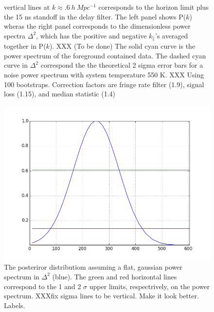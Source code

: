 \documentclass[twocolumn,numberedappendix]{emulateapj} \shorttitle{PSA64}
\begin{document}
\begin{figure}[h!]
{vertical lines at $k\approx{.6\ h\ Mpc^{-1}}$ corresponds to the horizon limit
plus the 15 ns standoff in the delay filter. The left panel shows P($k$) wheras
the right panel corresponds to the dimensionless power spectra $\Delta^{2}$,
which has the positive and negative $k_{\parallel}$'s averaged together in
P($k$). XXX (To be done) The solid cyan curve is the power spectrum of the
foreground contained data. The dashed cyan curve in $\Delta^{2}$ correspond the
the theoretical 2 sigma error bars for a noise power spectrum with system
temperature 550 K. XXX Using 100 bootstraps. Correction factors are fringe rate
filter (1.9), signal loss (1.15), and median statistic (1.4)
}
\label{fig:final_pspec}
\end{figure}

\begin{figure}[h!]\centering
\includegraphics[width=\columnwidth]{plots/flat_k3pk_posterior.png}
\caption{The posteriror distributiom assuming a flat, gaussian power spectrum in
$\Delta^{2}$ (blue). The green and red horizontal lines correspond to the 1 and
2 $\sigma$ upper limits, respectrively, on the power spectrum. XXXfix sigma
lines to be vertical. Make it look better. Labels.}
\label{fig:final_posterioir}
\end{figure}
\end{document}
